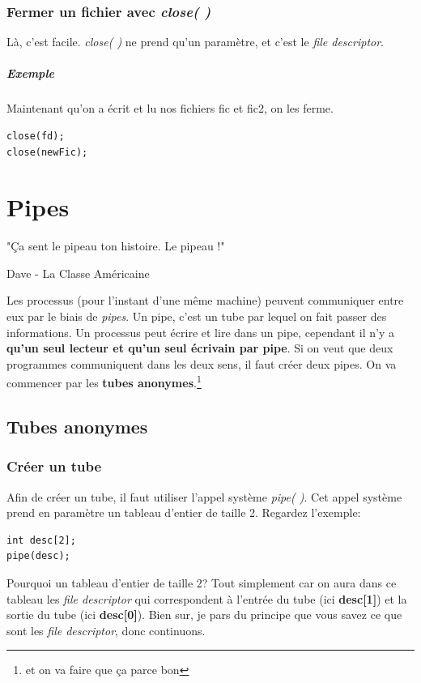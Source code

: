 \documentclass{report}
\begin{document}
\subsection{Fermer un fichier avec \emph{close( )}}
Là, c'est facile. \emph{close( )} ne prend qu'un paramètre, et c'est le \emph{file descriptor}.
\paragraph{Exemple}
Maintenant qu'on a écrit et lu nos fichiers fic et fic2, on les ferme.
\begin{lstlisting}
close(fd);
close(newFic);
\end{lstlisting}




\chapter{Pipes}
\epigraph{"Ça sent le pipeau ton histoire. Le pipeau !"}{Dave - La Classe Américaine}
Les processus (pour l'instant d'une même machine) peuvent communiquer entre eux par le biais de \emph{pipes}. Un pipe, c'est un tube par lequel on fait passer des informations. Un processus peut écrire et lire dans un pipe, cependant il n'y a \textbf{qu'un seul lecteur et qu'un seul écrivain par pipe}. Si on veut que deux programmes communiquent dans les deux sens, il faut créer deux pipes.
On va commencer par les \textbf{tubes anonymes}.\footnote{et on va faire que ça parce bon}

\section{Tubes anonymes}
\subsection{Créer un tube}
Afin de créer un tube, il faut utiliser l'appel système \emph{pipe( )}. Cet appel système prend en paramètre un tableau d'entier de taille 2. Regardez l'exemple:
\begin{verbatim}
int desc[2];
pipe(desc);
\end{verbatim}
Pourquoi un tableau d'entier de taille 2? Tout simplement car on aura dans ce tableau les \emph{file descriptor} qui correspondent à l'entrée du tube (ici \textbf{desc[1]}) et la sortie du tube (ici \textbf{desc[0]}). Bien sur, je pars du principe que vous savez ce que sont les \emph{file descriptor}, donc continuons.
\end{document}
